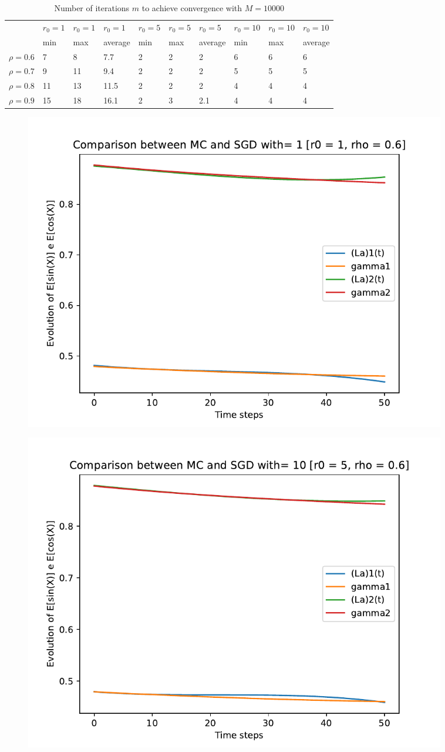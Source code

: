 \documentclass[a4paper,11pt,openright]{report}
\begin{document}
\begin{table}[H]
\centering
\addtolength{\leftskip}{-1.5cm}
\addtolength{\rightskip}{-1.5cm}
\begin{tabular}{|c|lllllllll|}
\hline
$ $ & $r_0 = 1$ & $r_0 = 1$ & $r_0 = 1$ & $r_0 = 5$ & $r_0 = 5$ & $r_0 = 5$ & $r_0 = 10$ & $r_0 = 10$ & $r_0 = 10$  \\
$ $ & min & max & average & min & max & average & min & max & average \\ 
\hline
$\rho = 0.6$ & 7 & 8 & 7.7 & 2 & 2 & 2 & 6 & 6 & 6\\

$\rho = 0.7$ & 9 & 11 & 9.4 & 2 & 2 & 2 & 5 & 5 & 5\\

$\rho = 0.8$ & 11 & 13 & 11.5 & 2 & 2 & 2 & 4 & 4 & 4\\

$\rho = 0.9$ & 15 & 18 & 16.1 & 2 & 3 & 2.1 & 4 & 4 & 4\\
\hline
\end{tabular}
\caption{Number of iterations $m$ to achieve convergence with $M = 10000$}
\end{table}
\begin{figure}[H]
\centering
\includegraphics[width=0.9\textwidth]{images/graphics T = 0.5/n = 3, M = 1 sine and cosine.pdf}
\end{figure}
\begin{figure}[H]
\centering
\includegraphics[width=0.9\textwidth]{images/graphics T = 0.5/n = 3, M = 10 sine and cosine.pdf}
\end{figure}
\end{document}

